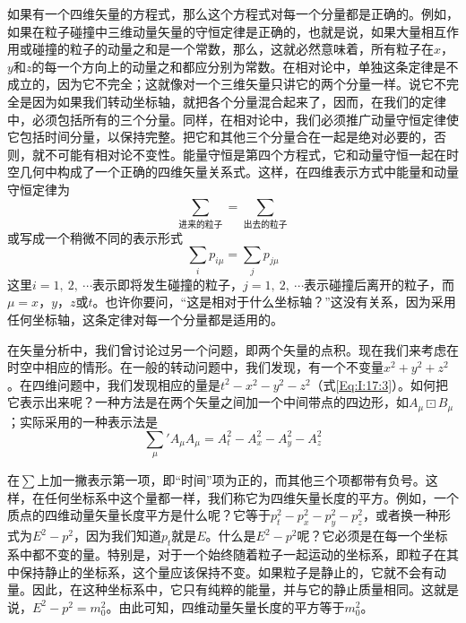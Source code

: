 如果有一个四维矢量的方程式，那么这个方程式对每一个分量都是正确的。例如，如果在粒子碰撞中三维动量矢量的守恒定律是正确的，也就是说，如果大量相互作用或碰撞的粒子的动量之和是一个常数，那么，这就必然意味着，所有粒子在$x$，$y$和$z$的每一个方向上的动量之和都应分别为常数。在相对论中，单独这条定律是不成立的，因为它不完全；这就像对一个三维矢量只讲它的两个分量一样。说它不完全是因为如果我们转动坐标轴，就把各个分量混合起来了，因而，在我们的定律中，必须包括所有的三个分量。同样，在相对论中，我们必须推广动量守恒定律使它包括时间分量，以保持完整。把它和其他三个分量合在一起是绝对必要的，否则，就不可能有相对论不变性。能量守恒是第四个方程式，它和动量守恒一起在时空几何中构成了一个正确的四维矢量关系式。这样，在四维表示方式中能量和动量守恒定律为
\begin{equation}
    \label{Eq:I:17:13}
    \mathop{\sum p_\mu}\limits_{\text{进来的粒子}} = \mathop{\sum p_\mu}\limits_{\text{出去的粒子}}
\end{equation}
或写成一个稍微不同的表示形式
\begin{equation}
    \label{Eq:I:17:14}
    \sum_i p_{i\mu} = \sum_j p_{j\mu}
\end{equation}
这里$i=1,~2,~\cdots$表示即将发生碰撞的粒子，$j=1,~2,~\cdots$表示碰撞后离开的粒子，而$\mu=x$，$y$，$z$或$t$。也许你要问，“这是相对于什么坐标轴？”这没有关系，因为采用任何坐标轴，这条定律对每一个分量都是适用的。

在矢量分析中，我们曾讨论过另一个问题，即两个矢量的点积。现在我们来考虑在时空中相应的情形。在一般的转动问题中，我们发现，有一个不变量$x^2+y^2+z^2$。在四维问题中，我们发现相应的量是$t^2-x^2-y^2-z^2$（式\ref{Eq:I:17:3}）。如何把它表示出来呢？一种方法是在两个矢量之间加一个中间带点的四边形，如$A_\mu \boxdot  B_\mu$；实际采用的一种表示法是
\begin{equation}
    \label{Eq:I:17:15}
    {\sum_{\mu}}' A_\mu A_\mu = A^2_t - A^2_x - A^2_y - A^2_z 
\end{equation}

在$\sum$上加一撇表示第一项，即“时间”项为正的，而其他三个项都带有负号。这样，在任何坐标系中这个量都一样，我们称它为四维矢量长度的平方。例如，一个质点的四维动量矢量长度平方是什么呢？它等于$p^2_t - p^2_x - p^2_y - p^2_z$，或者换一种形式为$E^2-p^2$，因为我们知道$p_t$就是$E$。什么是$E^2-p^2$呢？它必须是在每一个坐标系中都不变的量。特别是，对于一个始终随着粒子一起运动的坐标系，即粒子在其中保持静止的坐标系，这个量应该保持不变。如果粒子是静止的，它就不会有动量。因此，在这种坐标系中，它只有纯粹的能量，并与它的静止质量相同。这就是说，$E^2-p^2=m^2_0$。由此可知，四维动量矢量长度的平方等于$m^2_0$。

